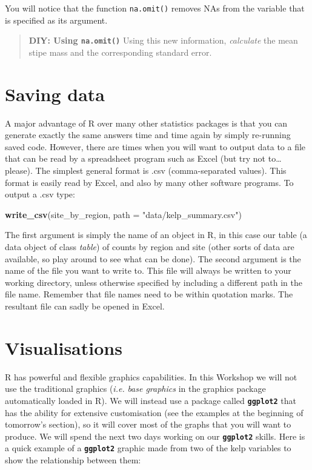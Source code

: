 \documentclass[]{book}
\newenvironment{Shaded}{\begin{snugshade}}{\end{snugshade}}
\newcommand{\KeywordTok}[1]{\textcolor[rgb]{0.13,0.29,0.53}{\textbf{#1}}}
\newcommand{\DataTypeTok}[1]{\textcolor[rgb]{0.13,0.29,0.53}{#1}}
\newcommand{\StringTok}[1]{\textcolor[rgb]{0.31,0.60,0.02}{#1}}
\newcommand{\NormalTok}[1]{#1}
\theoremstyle{definition}
\theoremstyle{definition}
\theoremstyle{definition}
\theoremstyle{remark}
\begin{document}
You will notice that the function \texttt{na.omit()} removes NAs from
the variable that is specified as its argument.

\begin{quote}
\textbf{DIY: Using \texttt{na.omit()}} Using this new information,
\emph{calculate} the mean stipe mass and the corresponding standard
error.
\end{quote}

\section{Saving data}\label{saving-data}

A major advantage of R over many other statistics packages is that you
can generate exactly the same answers time and time again by simply
re-running saved code. However, there are times when you will want to
output data to a file that can be read by a spreadsheet program such as
Excel (but try not to\ldots{} please). The simplest general format is
.csv (comma-separated values). This format is easily read by Excel, and
also by many other software programs. To output a .csv type:

\begin{Shaded}
\begin{Highlighting}[]
\KeywordTok{write_csv}\NormalTok{(site_by_region, }\DataTypeTok{path =} \StringTok{"data/kelp_summary.csv"}\NormalTok{)}
\end{Highlighting}
\end{Shaded}

The first argument is simply the name of an object in R, in this case
our table (a data object of class \emph{table}) of counts by region and
site (other sorts of data are available, so play around to see what can
be done). The second argument is the name of the file you want to write
to. This file will always be written to your working directory, unless
otherwise specified by including a different path in the file name.
Remember that file names need to be within quotation marks. The
resultant file can sadly be opened in Excel.

\section{Visualisations}\label{visualisations}

R has powerful and flexible graphics capabilities. In this Workshop we
will not use the traditional graphics (\emph{i.e.} \emph{base graphics}
in the graphics package automatically loaded in R). We will instead use
a package called \textbf{\texttt{ggplot2}} that has the ability for
extensive customisation (see the examples at the beginning of tomorrow's
section), so it will cover most of the graphs that you will want to
produce. We will spend the next two days working on our
\textbf{\texttt{ggplot2}} skills. Here is a quick example of a
\textbf{\texttt{ggplot2}} graphic made from two of the kelp variables to
show the relationship between them:
\end{document}
